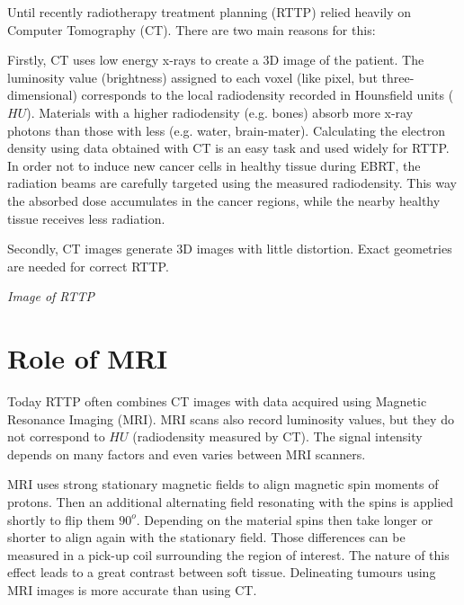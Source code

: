 Until recently radiotherapy treatment planning (RTTP) relied heavily on Computer Tomography (CT). There are two main reasons for this:

Firstly, CT uses low energy x-rays to create a 3D image of the patient. The luminosity value (brightness) assigned to each voxel (like pixel, but three-dimensional) corresponds to
the local radiodensity recorded in Hounsfield units ($HU$). Materials with a higher radiodensity (e.g. bones) absorb more x-ray photons than those with less (e.g. water, brain-mater).
Calculating the electron density using data obtained with CT is an easy task and used widely for RTTP. \cite{Constantinou2012, Schneider1996}
In order not to induce new cancer cells in healthy tissue during EBRT, the radiation beams are carefully targeted using the measured radiodensity. 
This way the absorbed dose accumulates in the cancer regions, while the nearby healthy tissue receives less radiation.

Secondly, CT images generate 3D images with little distortion. Exact geometries are needed for correct RTTP. %

\vspace{4cm}
\textit{Image of RTTP}
\vspace{2cm}

\section{Role of MRI}



Today RTTP often combines CT images with data acquired using Magnetic Resonance Imaging (MRI).
MRI scans also record luminosity values, but they do not correspond to $HU$ (radiodensity measured by CT).
The signal intensity depends on many factors and even varies between MRI scanners.

MRI uses strong stationary magnetic fields to align magnetic spin moments of protons. Then an additional alternating field resonating with the spins is applied shortly to flip them $90^o$.
Depending on the material spins then take longer or shorter to align again with the stationary field. Those differences can be measured in a pick-up coil surrounding the
region of interest. The nature of this effect leads to a great contrast between soft tissue. \cite{Currie2013} Delineating tumours using MRI images is more accurate than using CT.
\cite{Rasch1999, Debois1999a, Roach1996}

